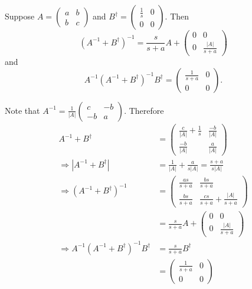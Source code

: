 \documentclass{article}
\begin{document}
\begin{fact} \label{rewrite_inverse}
Suppose $A=\left(\begin{array}{cc}a & b \\ b & c \end{array}\right)$ and $B^\dagger = \left(\begin{array}{cc} \frac{1}{s} & 0 \\ 0 & 0 \end{array}\right)$. Then 
\begin{equation}
(A^{-1}+B^\dagger)^{-1}=\frac{s}{s+a}A+\left(\begin{array}{cc}0 & 0 \\ 0 & \frac{|A|}{s+a}\end{array}\right)
\end{equation}
and
\begin{equation}
A^{-1}(A^{-1}+B^\dagger)^{-1}B^\dagger=\left(\begin{array}{cc}\frac{1}{s+a} & 0 \\ 0 & 0 \end{array}\right).
\end{equation}
\end{fact}

\begin{pf} 
Note that $A^{-1}=\frac{1}{|A|}\left(\begin{array}{cc}c & -b \\ -b & a \end{array}\right)$. Therefore
\begin{align*}
A^{-1}+B^\dagger & =\left(\begin{array}{cc}\frac{c}{|A|}+\frac{1}{s} & \frac{-b}{|A|} \\  \frac{-b}{|A|} & \frac{a}{|A|} \end{array}\right)
\\ \Rightarrow |A^{-1}+B^\dagger|&=\frac{1}{|A|}+\frac{a}{s|A|}=\frac{s+a}{s|A|}
\\ \Rightarrow (A^{-1}+B^\dagger)^{-1}&=\left(\begin{array}{cc}\frac{as}{s+a} & \frac{bs}{s+a} \\ \frac{bs}{s+a} & \frac{cs}{s+a}+\frac{|A|}{s+a} \end{array}\right)
\\ &=\frac{s}{s+a}A+\left(\begin{array}{cc}0 & 0 \\ 0 & \frac{|A|}{s+a}\end{array}\right)
\\\Rightarrow A^{-1}(A^{-1}+B^\dagger)^{-1}B^\dagger & = \frac{s}{s+a}B^\dagger
\\&=\left(\begin{array}{cc}\frac{1}{s+a} & 0 \\ 0 & 0 \end{array}\right)
\end{align*}
\end{pf}
\end{document}
